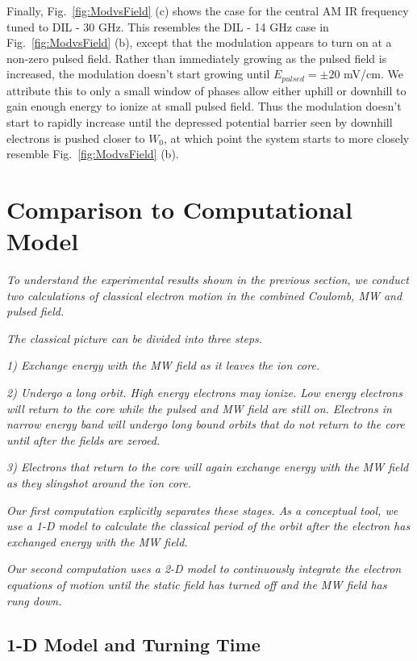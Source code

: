 \documentclass[aps,pra,preprint,groupedaddress]{revtex4-1}
\begin{document}
Finally, Fig.~\ref{fig:ModvsField} (c) shows the case for the central AM IR frequency tuned to DIL - 30 GHz. This resembles the DIL - 14 GHz case in Fig.~\ref{fig:ModvsField} (b), except that the modulation appears to turn on at a non-zero pulsed field. Rather than immediately growing as the pulsed field is increased, the modulation doesn't start growing until $E_{pulsed} = \pm 20$ mV/cm. We attribute this to only a small window of phases allow either uphill or downhill to gain enough energy to ionize at small pulsed field. Thus the modulation doesn't start to rapidly increase until the depressed potential barrier seen by downhill electrons is pushed closer to $W_0$, at which point the system starts to more closely resemble Fig.~\ref{fig:ModvsField} (b).

\section{\label{sec:disc} Comparison to Computational Model}

\emph{To understand the experimental results shown in the previous section, we conduct two calculations of classical electron motion in the combined Coulomb, MW and pulsed field.}

\emph{The classical picture can be divided into three steps.}

\emph{1) Exchange energy with the MW field as it leaves the ion core.}

\emph{2) Undergo a long orbit. High energy electrons may ionize. Low energy electrons will return to the core while the pulsed and MW field are still on. Electrons in narrow energy band will undergo long bound orbits that do not return to the core until after the fields are zeroed.}

\emph{3) Electrons that return to the core will again exchange energy with the MW field as they slingshot around the ion core.}

\emph{Our first computation explicitly separates these stages. As a conceptual tool, we use a 1-D model to calculate the classical period of the orbit after the electron has exchanged energy with the MW field.}

\emph{Our second computation uses a 2-D model to continuously integrate the electron equations of motion until the static field has turned off and the MW field has rung down.}

\subsection{1-D Model and Turning Time}
\end{document}
